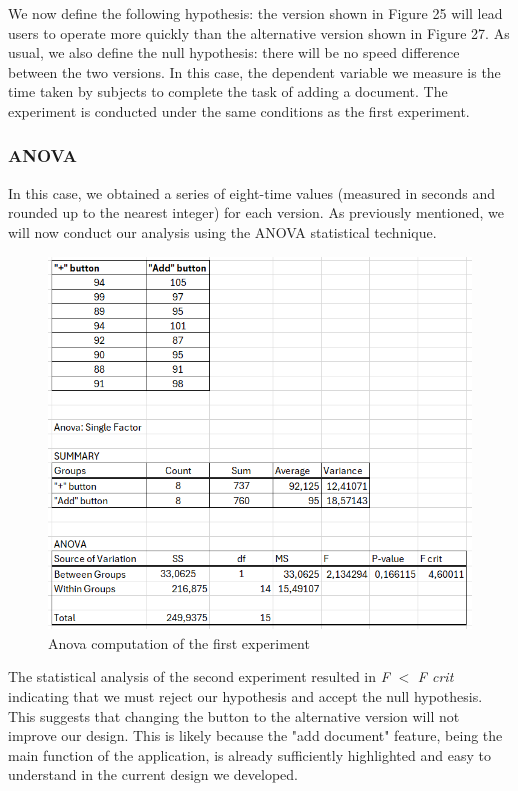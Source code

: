 			\noindent
			We now define the following hypothesis: the version shown in Figure 25 will lead users to operate more quickly than the alternative version shown in Figure 27. As usual, we also define the null hypothesis: there will be no speed difference between the two versions. In this case, the dependent variable we measure is the time taken by subjects to complete the task of adding a document. The experiment is conducted under the same conditions as the first experiment.\\
			\clearpage
		\subsubsection{ANOVA}
			In this case, we obtained a series of eight-time values (measured in seconds and rounded up to the nearest integer) for each version. As previously mentioned, we will now conduct our analysis using the ANOVA statistical technique.
			\begin{figure}[htbp]
				\centering
				\includegraphics[width=1\textwidth]{../Draw.io diagrams/anova_+_add.png}  %
				\caption{Anova computation of the first experiment}
			\end{figure}
			
			\noindent
			The statistical analysis of the second experiment resulted in \textit{F} \(<\) \textit{F crit} indicating that we must reject our hypothesis and accept the null hypothesis. This suggests that changing the button to the alternative version will not improve our design. This is likely because the "add document" feature, being the main function of the application, is already sufficiently highlighted and easy to understand in the current design we developed.
			\clearpage
